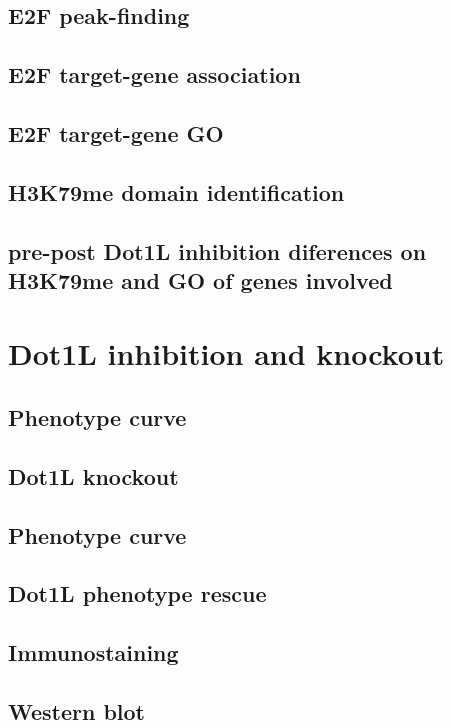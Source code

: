 \documentclass[11pt,twoside,a4paper]{report}
\begin{document}
		\subsection{E2F peak-finding}
		\subsection{E2F target-gene association}
		\subsection{E2F target-gene GO}
		\subsection{H3K79me domain identification}
		\subsection{pre-post Dot1L inhibition diferences on H3K79me and GO of genes involved}

	\section{Dot1L inhibition and knockout}
		\subsection{Phenotype curve}
		\subsection{Dot1L knockout}
		\subsection{Phenotype curve}
		\subsection{Dot1L phenotype rescue}

		\subsection{Immunostaining}
		\subsection{Western blot}


\clearpage


\end{document}
